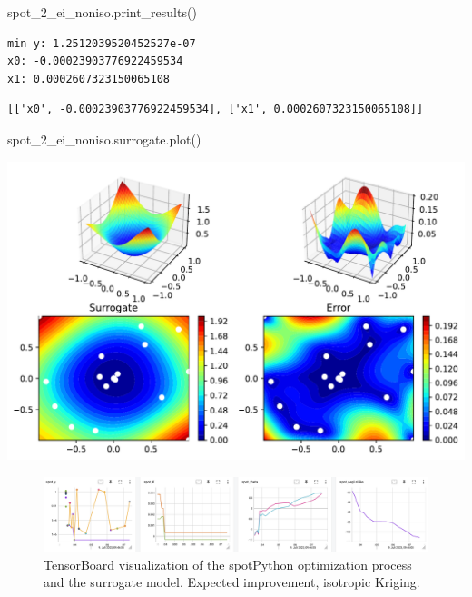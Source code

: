 \documentclass[
  letterpaper,
  DIV=11,
  numbers=noendperiod]{scrreprt}
\newenvironment{Shaded}{\begin{snugshade}}{\end{snugshade}}
\newcommand{\NormalTok}[1]{\textcolor[rgb]{0.00,0.23,0.31}{#1}}
\begin{document}
\begin{Shaded}
\begin{Highlighting}[]
\NormalTok{spot\_2\_ei\_noniso.print\_results()}
\end{Highlighting}
\end{Shaded}

\begin{verbatim}
min y: 1.2512039520452527e-07
x0: -0.00023903776922459534
x1: 0.0002607323150065108
\end{verbatim}

\begin{verbatim}
[['x0', -0.00023903776922459534], ['x1', 0.0002607323150065108]]
\end{verbatim}

\begin{Shaded}
\begin{Highlighting}[]
\NormalTok{spot\_2\_ei\_noniso.surrogate.plot()}
\end{Highlighting}
\end{Shaded}

\includegraphics{012_num_spot_ei_files/figure-pdf/cell-16-output-1.pdf}

\begin{figure}[H]

{\centering \includegraphics[width=1\textwidth,height=\textheight]{figures_static/07_tensorboard_EI_NONISO.png}

}

\caption{TensorBoard visualization of the spotPython optimization
process and the surrogate model. Expected improvement, isotropic
Kriging.}

\end{figure}%
\end{document}
